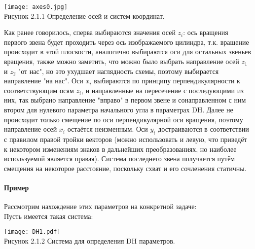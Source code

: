\begin{center}
    \texttt{[image: axes0.jpg]}\\
    Рисунок 2.1.1 Определение осей и систем координат.
\end{center}

\hspace*{\parindent}Как ранее говорилось, сперва выбираются значения осей $z_i$: ось вращения первого звена будет проходить через ось изображаемого цилиндра, т.к. вращение происходит в этой плоскости, аналогично выбираются оси для остальных звеньев вращения, также можно заметить, что можно было выбрать направление осей $z_1$ и $z_2$ "от нас", но это  ухудшает наглядность схемы, поэтому выбирается направление "на нас". Оси $x_i$ выбираются по принципу перпендикулярности к соответствующим осям $z_i$, и направленные на пересечение с последующими из них, так выбрано направление "вправо" в первом звене и сонаправленном с ним втором для нулевого параметра начального угла в параметрах DH. Далее не происходит только смещение по оси перпендикулярной оси вращения, поэтому направление осей $x_i$ остаётся неизменным. Оси $y_i$ достраиваются в соответствии с правилом правой тройки векторов (можно использовать и левую, что приведёт к некотором изменениям знаков в дальнейших преобразованиях, но наиболее используемой является правая). Система последнего звена получается путём смещения на некоторое расстояние, поскольку схват и его сочленения статичны.\\
 
 \paragraph*{Пример\\}
 
\hspace*{\parindent}Рассмотрим нахождение этих параметров на конкретной задаче:\\

Пусть имеется такая система:\\
\begin{center}
    \texttt{[image: DH1.pdf]}\\
    Рисунок 2.1.2 Система для определения DH параметров.\\
\end{center}



